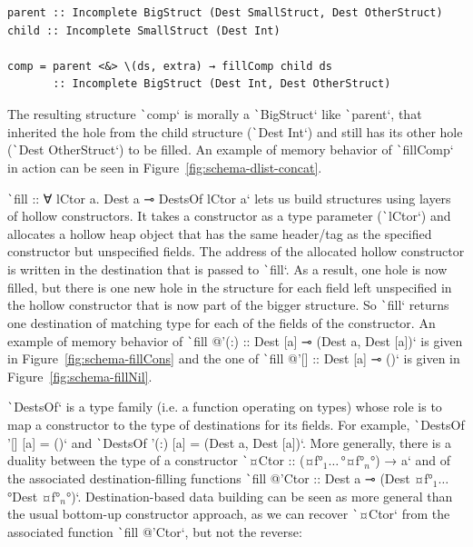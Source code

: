 \documentclass[english]{jflart}
\newlength{\currentparskip}
\newenvironment{unbreakable}
{%
  \setlength{\currentparskip}{\parskip}%
  \setlength{\parskip}{\currentparskip}%
  \par\vspace{0.5\baselineskip}%
  \noindent\begin{minipage}{\textwidth}%
    \setlength{\parskip}{\currentparskip}%
}
{%
  \end{minipage}%
  \par\vspace{0.5\baselineskip}%
}
\begin{document}
\begin{unbreakable}
{\small
\begin{verbatim}
parent :: Incomplete BigStruct (Dest SmallStruct, Dest OtherStruct)
child :: Incomplete SmallStruct (Dest Int)

comp = parent <&> \(ds, extra) → fillComp child ds
       :: Incomplete BigStruct (Dest Int, Dest OtherStruct)
\end{verbatim}
}
\end{unbreakable}

The resulting structure \texttt`comp` is morally a \texttt`BigStruct` like \texttt`parent`, that inherited the hole from the child structure (\texttt`Dest Int`) and still has its other hole (\texttt`Dest OtherStruct`) to be filled. An example of memory behavior of \texttt`fillComp` in action can be seen in Figure~\ref{fig:schema-dlist-concat}.

\texttt`fill :: ∀ lCtor a. Dest a ⊸ DestsOf lCtor a` lets us build structures using layers of hollow constructors. It takes a constructor as a type parameter (\texttt`lCtor`) and allocates a hollow heap object that has the same header/tag as the specified constructor but unspecified fields. The address of the allocated hollow constructor is written in the destination that is passed to \texttt`fill`. As a result, one hole is now filled, but there is one new hole in the structure for each field left unspecified in the hollow constructor that is now part of the bigger structure. So \texttt`fill` returns one destination of matching type for each of the fields of the constructor. An example of memory behavior of \texttt`fill @'(:) :: Dest [a] ⊸ (Dest a, Dest [a])` is given in Figure~\ref{fig:schema-fillCons} and the one of \texttt`fill @'[] :: Dest [a] ⊸ ()` is given in Figure~\ref{fig:schema-fillNil}.

\texttt`DestsOf` is a type family (i.e. a function operating on types) whose role is to map a constructor to the type of destinations for its fields. For example, \texttt`DestsOf '[] [a] = ()` and \texttt`DestsOf '(:) [a] = (Dest a, Dest [a])`. More generally, there is a duality between the type of a constructor \texttt`¤Ctor :: (¤f°$_1\ldots\,$°¤f°$_n$°) → a` and of the associated destination-filling functions \texttt`fill @'Ctor :: Dest a ⊸ (Dest ¤f°$_1\ldots\,$°Dest ¤f°$_n$°)`. Destination-based data building can be seen as more general than the usual bottom-up constructor approach, as we can recover \texttt`¤Ctor` from the associated function \texttt`fill @'Ctor`, but not the reverse:
\end{document}
